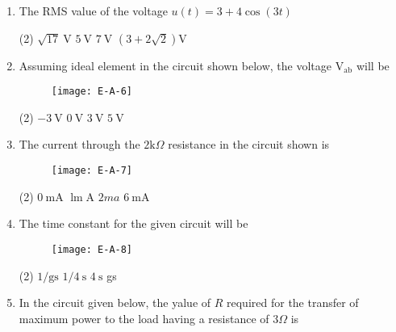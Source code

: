 \begin{enumerate}
	\begin{figure}[H]
		\centering
		\texttt{[image: E-A-5]}
		\caption{}
		\label{}
	\end{figure}
	 \begin{tasks}(2)
	\end{tasks}
	\item The RMS value of the voltage $u(t)=3+4 \cos (3 t)$
	 \begin{tasks}(2)
		\task[\textbf{a.}]$\sqrt{17} \mathrm{~V}$
		\task[\textbf{b.}]$5 \mathrm{~V}$
		\task[\textbf{c.}]$7 \mathrm{~V}$
		\task[\textbf{d.}] $(3+2 \sqrt{2}) \mathrm{V}$
	\end{tasks}
	\item Assuming ideal element in the circuit shown below, the voltage $\mathrm{V}_{\mathrm{ab}}$ will be
	\begin{figure}[H]
		\centering
		\texttt{[image: E-A-6]}
	\end{figure}
	 \begin{tasks}(2)
		\task[\textbf{a.}]$-3 \mathrm{~V}$
		\task[\textbf{b.}] $0 \mathrm{~V}$
		\task[\textbf{c.}]$3 \mathrm{~V}$
		\task[\textbf{d.}] $5 \mathrm{~V}$
	\end{tasks}
	\item The current through the $2 \mathrm{k} \Omega$ resistance in the circuit shown is
	\begin{figure}[H]
		\centering
		\texttt{[image: E-A-7]}
		\caption{}
		\label{}
	\end{figure}
	 \begin{tasks}(2)
		\task[\textbf{a.}]$0 \mathrm{~mA}$
		\task[\textbf{b.}]$\operatorname{lm} \mathrm{A}$
		\task[\textbf{c.}]$2 m a$
		\task[\textbf{d.}]  $6 \mathrm{~mA}$
	\end{tasks}
	\item The time constant for the given circuit will be
	\begin{figure}[H]
		\centering
		\texttt{[image: E-A-8]}
	\end{figure}
	 \begin{tasks}(2)
		\task[\textbf{a.}] $1 / \mathrm{gs}$
		\task[\textbf{b.}]$1 / 4 \mathrm{~s}$
		\task[\textbf{c.}] $4 \mathrm{~s}$
		\task[\textbf{d.}] gs
	\end{tasks}
	\item In the circuit given below, the yalue of $R$ required for the transfer of maximum power to the load having a resistance of $3 \Omega$ is

\end{enumerate}

